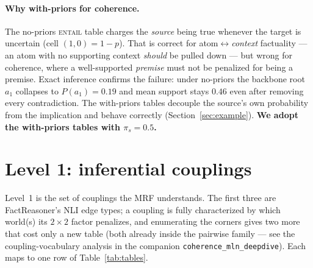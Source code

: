 \documentclass[11pt]{article}
\begin{document}
\paragraph{Why with-priors for coherence.} The no-priors \textsc{entail} table charges the
\emph{source} being true whenever the target is uncertain (cell $(1,0){=}1{-}p$). That is
correct for atom$\leftrightarrow$\emph{context} factuality --- an atom with no supporting
context \emph{should} be pulled down --- but wrong for coherence, where a well-supported
\emph{premise} must not be penalized for being a premise. Exact inference confirms the
failure: under no-priors the backbone root $a_1$ collapses to $P(a_1){=}0.19$ and mean
support stays $0.46$ even after removing every contradiction. The with-priors tables
decouple the source's own probability from the implication and behave correctly
(Section~\ref{sec:example}). \textbf{We adopt the with-priors tables with $\pi_s=0.5$.}

\section{Level 1: inferential couplings}
\label{sec:level1}

Level~1 is the set of couplings the MRF understands. The first three are FactReasoner's NLI
edge types; a coupling is fully characterized by which world(s) its $2\times2$ factor
penalizes, and enumerating the corners gives two more that cost only a new table (both
already inside the pairwise family --- see the coupling-vocabulary analysis in the companion
\texttt{coherence\_mln\_deepdive}). Each maps to one row of Table~\ref{tab:tables}.
\end{document}
